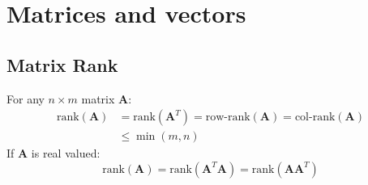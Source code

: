 \chapter{Matrices and vectors}

\section{Matrix Rank}
For any $n \times m$ matrix $\bm{A}$:
\begin{align}
	\text{rank}(\bm{A}) &= \text{rank}(\bm{A}^T) = \text{row-rank}(\bm{A}) = \text{col-rank}(\bm{A})\\
	& \leq \min(m, n)
\end{align}
If $\bm{A}$ is real valued:
\begin{equation}
	\text{rank}(\bm{A}) = \text{rank}(\bm{A}^T \bm{A}) = \text{rank}(\bm{A} \bm{A}^T)
\end{equation}

